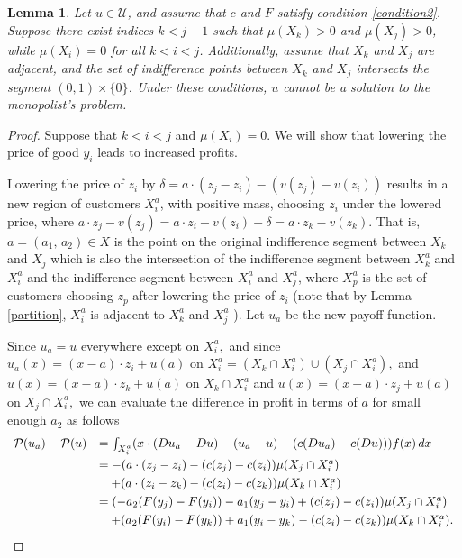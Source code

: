 \documentclass[12pt,reqno]{amsart}
\newtheorem{lem}{Lemma}
\begin{document}
\begin{lem}\label{between1}
   Let $ u \in \mathcal{U} $, and assume that $ c $ and $ F $ satisfy condition \ref{condition2}. Suppose there exist indices $ k < j - 1 $ such that $ \mu(X_k) > 0 $ and $ \mu(X_j) > 0 $, while $ \mu(X_i) = 0 $ for all $ k < i < j $. Additionally, assume that $ X_k $ and $ X_j $ are adjacent, and the set of indifference points between $ X_k $ and $ X_j $ intersects the segment $ (0,1) \times \{0\} $. Under these conditions, $ u $ cannot be a solution to the monopolist's problem.

\end{lem}

    





\begin{proof}

    
          Suppose that $k<i<j$ and $\mu(X_i)=0.$  We will show that lowering the price of good $y_i$ leads to increased profits.  

          Lowering the price of $z_i$ by $\delta=a\cdot(z_j-z_i)-(v(z_j)-v(z_i))$ results in a new region of customers  $X_i^a$, with positive mass, choosing $z_i$ under the lowered price, where  $a\cdot z_j-v(z_j)=a\cdot z_i-v(z_i)+\delta=a\cdot z_k-v(z_k)$.  That is, $a=(a_1,\,a_2)\in X$ is the point on the original indifference segment between $X_k$ and $X_j$ which is also the intersection of the indifference segment between $X_k^a$ and $X_i^a$ and the indifference segment between $X_i^a$ and $X_j^a$, where $X_p^a$ is the set of customers choosing $z_p$ after lowering the price of $z_i$ (note that by Lemma \ref{partition},  $X_i^a$  is adjacent to $X_k^a$ and $X_j^a$ ). Let $u_a$ be the new payoff function.
          
          
          
     

          Since $u_a=u$ everywhere except on $ X_i^a,$ and since  $u_a(x)=(x-a)\cdot z_i+u(a)$ on $X_i^a=(X_k\cap X_i^a)\cup(X_j\cap X_i^a),$ and $u(x)=(x-a)\cdot z_k+u(a)$ on $ X_k\cap X_i^a$ and $u(x)=(x-a)\cdot z_j+u(a)$ on $ X_j\cap X_i^a,$ we can  evaluate the difference in profit in terms of $a$ for small enough $a_2$ as follows
        \[\begin{array}{ll}
            
       \mathcal{P}(u_a)-\mathcal{P}(u)&=
       \int_{X_i^a}(x\cdot(Du_a-Du)-(u_a-u)-(c(Du_a)-c(Du)))f(x)\,dx\vspace{3pt}\\
       &= -(a\cdot(z_j-z_i)-(c(z_j)-c(z_i))\mu( X_j\cap X_i^a)\vspace{3pt}\\
       &\quad +(a\cdot(z_i-z_k)-(c(z_i)-c(z_k))\mu( X_k\cap X_i^a)\vspace{3pt}\\
&= (-a_2(F(y_j)-F(y_i))-a_1(y_j-y_i)+(c(z_j)-c(z_i))\mu( X_j\cap X_i^a)\vspace{3pt}\\
 & \quad +(a_2(F(y_i)-F(y_k))+a_1(y_i-y_k)
      -(c(z_i)-c(z_k))\mu( X_k\cap X_i^a).
        \end{array}\]
     

\end{proof}
\end{document}
